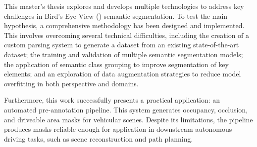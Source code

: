 
This master's thesis explores and develops multiple technologies to address key challenges in Bird's-Eye View () semantic segmentation. To test the main hypothesis, a comprehensive methodology has been designed and implemented. This involves overcoming several technical difficulties, including the creation of a custom parsing system to generate a  dataset from an existing state-of-the-art dataset; the training and validation of multiple semantic segmentation models; the application of semantic class grouping to improve segmentation of key elements; and an exploration of data augmentation strategies to reduce model overfitting in both perspective and  domains.

Furthermore, this work successfully presents a practical application: an automated pre-annotation pipeline. This system generates occupancy, occlusion, and driveable area masks for vehicular scenes. Despite its limitations, the pipeline produces masks reliable enough for application in downstream autonomous driving tasks, such as scene reconstruction and path planning.

